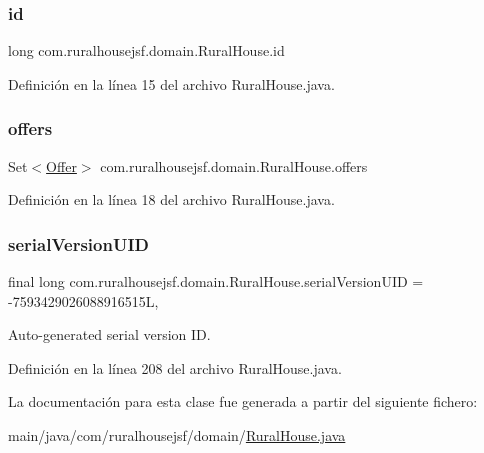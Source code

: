 \mbox{\label{a00188_ad9352e84ead5c4feb7eadee60570d9de}} 
\subsubsection{\texorpdfstring{id}{id}}
{\footnotesize\ttfamily long com.\+ruralhousejsf.\+domain.\+Rural\+House.\+id\hspace{0.3cm}{\ttfamily [private]}}



Definición en la línea 15 del archivo Rural\+House.\+java.

\mbox{\label{a00188_a8e07bbd638166d5d9356828a4ce09488}} 
\subsubsection{\texorpdfstring{offers}{offers}}
{\footnotesize\ttfamily Set$<$\mbox{\hyperlink{a00184}{Offer}}$>$ com.\+ruralhousejsf.\+domain.\+Rural\+House.\+offers\hspace{0.3cm}{\ttfamily [private]}}



Definición en la línea 18 del archivo Rural\+House.\+java.

\mbox{\label{a00188_a2ef1095a366b8e08e491c70cd421b907}} 
\subsubsection{\texorpdfstring{serialVersionUID}{serialVersionUID}}
{\footnotesize\ttfamily final long com.\+ruralhousejsf.\+domain.\+Rural\+House.\+serial\+Version\+U\+ID = -\/7593429026088916515L\hspace{0.3cm}{\ttfamily [static]}, {\ttfamily [private]}}



Auto-\/generated serial version ID. 



Definición en la línea 208 del archivo Rural\+House.\+java.



La documentación para esta clase fue generada a partir del siguiente fichero\+:\begin{DoxyCompactItemize}
\item 
main/java/com/ruralhousejsf/domain/\mbox{\hyperlink{a00047}{Rural\+House.\+java}}\end{DoxyCompactItemize}
